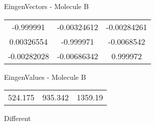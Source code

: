 \begin{multicols}{2}
\begin{center}
\vtab
 EingenVectors - Molecule B     \\
\vtab
\begin{tabular}{|c c c|}
-0.999991	 & 	-0.00324612	 & 	-0.00284261	 \\
0.00326554	 & 	-0.999971	 & 	-0.0068542	 \\
-0.00282028	 & 	-0.00686342	 & 	0.999972
\end{tabular}

\vtab
 EingenValues - Molecule B     \\
\vtab
\begin{tabular}{|c c c|}
524.175	 & 	935.342	 & 	1359.19	 \\
\end{tabular}

\end{center}
\end{multicols}
\begin{center}
\vtab
\vtab
\textcolor{NavyBlue}{\Large Different}
\end{center}

 \newpage

